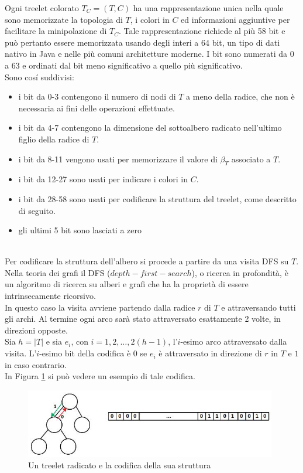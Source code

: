 Ogni treelet colorato $ T_C = (T,C) $ ha una rappresentazione unica nella quale sono memorizzate la topologia di $ T $, i colori in $ C $ ed informazioni aggiuntive per facilitare la minipolazione di $T_C$.
Tale rappresentazione richiede al pi\`u 58 bit e pu\`o pertanto essere memorizzata usando degli interi a 64 bit, un tipo di dati nativo in Java e nelle pi\`u comuni architetture moderne.
I bit sono numerati da 0 a 63 e ordinati dal bit meno significativo a quello pi\`u significativo.\\
Sono cos\'i suddivisi:
\begin{itemize}
	\item i bit da 0-3 contengono il numero di nodi di $ T $ a meno della radice, che non \`e necessaria ai fini delle operazioni effettuate.
	\item i bit da 4-7 contengono la dimensione del sottoalbero radicato nell'ultimo figlio della radice di $ T $.
	\item i bit da 8-11 vengono usati per memorizzare il valore di $ \beta_T $ associato a $ T $.
	\item i bit da 12-27 sono usati per indicare i colori in $ C $.
	\item i bit da 28-58 sono usati per codificare la struttura del treelet, come descritto di seguito.
	\item gli ultimi 5 bit sono lasciati a zero
\end{itemize}\mbox{}\\

Per codificare la struttura dell'albero si procede a partire da una visita DFS su $ T $.
Nella teoria dei grafi il DFS ($ depth-first-search $), o ricerca in profondit\`a, \`e un algoritmo di ricerca su alberi e grafi che ha la propriet\`a di essere intrinsecamente ricorsivo. \\
In questo caso la visita avviene partendo dalla radice $ r $ di $ T $ e attraversando tutti gli archi. Al termine ogni arco sar\`a stato attraversato esattamente 2 volte, in direzioni opposte. \\
Sia $h=|T|$ e sia $e_i$, con $i = 1, 2, \dots, 2(h-1)$, l'$i$-esimo arco attraversato dalla visita. 
L'$i$-esimo bit della codifica \`e $0$ se $e_i$ \`e attraversato in direzione di $r$ in $T$ e $1$ in caso contrario.\\
 In Figura \ref{figura} si pu\`o vedere un esempio di tale codifica.

\begin{figure}[htbp]
	\centering
	\includegraphics[width=11cm]{capitolo2/grafo3}
	\caption{Un treelet radicato e la codifica della sua struttura}
	\label{figura}
\end{figure}

